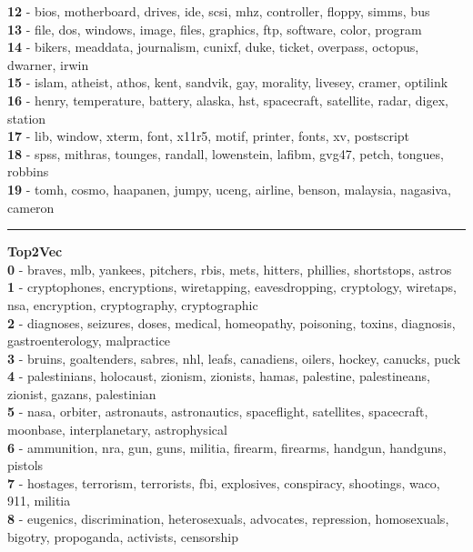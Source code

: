 \textbf{12} - bios, motherboard, drives, ide, scsi, mhz, controller, floppy, simms, bus\\
\textbf{13} - file, dos, windows, image, files, graphics, ftp, software, color, program\\
\textbf{14} - bikers, meaddata, journalism, cunixf, duke, ticket, overpass, octopus, dwarner, irwin\\
\textbf{15} - islam, atheist, athos, kent, sandvik, gay, morality, livesey, cramer, optilink\\
\textbf{16} - henry, temperature, battery, alaska, hst, spacecraft, satellite, radar, digex, station\\
\textbf{17} - lib, window, xterm, font, x11r5, motif, printer, fonts, xv, postscript\\
\textbf{18} - spss, mithras, tounges, randall, lowenstein, lafibm, gvg47, petch, tongues, robbins\\
\textbf{19} - tomh, cosmo, haapanen, jumpy, uceng, airline, benson, malaysia, nagasiva, cameron\\
\hrule\vspace{2mm}
\noindent
\textbf{Top2Vec}\vspace{2mm}\\
\vspace{2mm}
\noindent
\textbf{0} - braves, mlb, yankees, pitchers, rbis, mets, hitters, phillies, shortstops, astros\\
\textbf{1} - cryptophones, encryptions, wiretapping, eavesdropping, cryptology, wiretaps, nsa, encryption, cryptography, cryptographic\\
\textbf{2} - diagnoses, seizures, doses, medical, homeopathy, poisoning, toxins, diagnosis, gastroenterology, malpractice\\
\textbf{3} - bruins, goaltenders, sabres, nhl, leafs, canadiens, oilers, hockey, canucks, puck\\
\textbf{4} - palestinians, holocaust, zionism, zionists, hamas, palestine, palestineans, zionist, gazans, palestinian\\
\textbf{5} - nasa, orbiter, astronauts, astronautics, spaceflight, satellites, spacecraft, moonbase, interplanetary, astrophysical\\
\textbf{6} - ammunition, nra, gun, guns, militia, firearm, firearms, handgun, handguns, pistols\\
\textbf{7} - hostages, terrorism, terrorists, fbi, explosives, conspiracy, shootings, waco, 911, militia\\
\textbf{8} - eugenics, discrimination, heterosexuals, advocates, repression, homosexuals, bigotry, propoganda, activists, censorship\\
